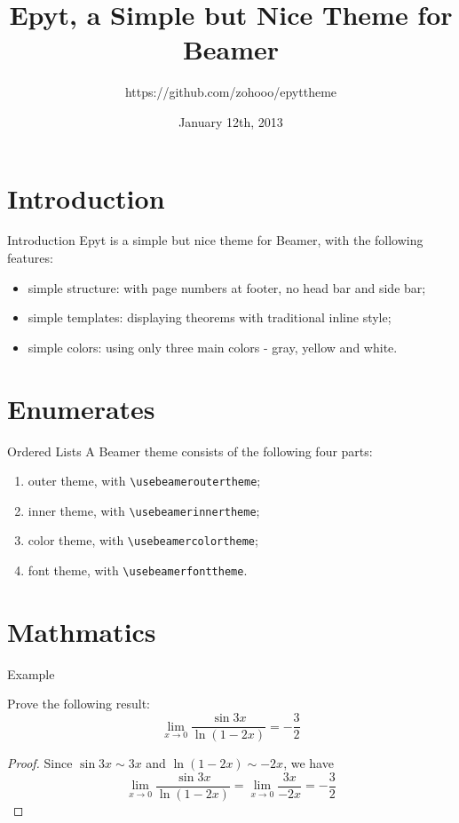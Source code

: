 \documentclass[14pt]{beamer}
\title{Epyt, a Simple but Nice Theme for Beamer}
\author{https://github.com/zohooo/epyttheme}
\date{January 12th, 2013}
\begin{document}
\begin{frame}[plain]\transboxout
\titlepage
\end{frame}

\begin{frame}\transboxin
\begin{center}
\tableofcontents[hideallsubsections]
\end{center}
\end{frame}

\section{Introduction}

\begin{frame}{Introduction}
Epyt is a simple but nice theme for Beamer, with the following features: \pause
\begin{itemize}[<+->]
\item simple structure: with page numbers at footer, no head bar and side bar;
\item simple templates: displaying theorems with traditional inline style;
\item simple colors: using only three main colors - gray, yellow and white.
\end{itemize}
\end{frame}

\section{Enumerates}

\begin{frame}[fragile]{Ordered Lists}
A Beamer theme consists of the following four parts: \pause
\begin{enumerate}[<+->]
\item outer theme, with \verb!\usebeameroutertheme!;
\item inner theme, with \verb!\usebeamerinnertheme!;
\item color theme, with \verb!\usebeamercolortheme!;
\item font theme, with \verb!\usebeamerfonttheme!.
\end{enumerate}
\end{frame}

\section{Mathmatics}

\begin{frame}{Example}
\begin{example}
Prove the following result:
\[ \lim_{x\to0}\frac{\sin 3x}{\ln(1-2x)}=-\frac{3}{2} \]
\end{example}\pause
\begin{proof}
Since $\sin 3x \sim 3x$ and $\ln(1-2x) \sim -2x$, we have
\[ \lim_{x\to0}\frac{\sin 3x}{\ln(1-2x)}=\lim_{x\to0}\frac{3x}{-2x}=-\frac{3}{2} \]
\end{proof}
\end{frame}
\end{document}
